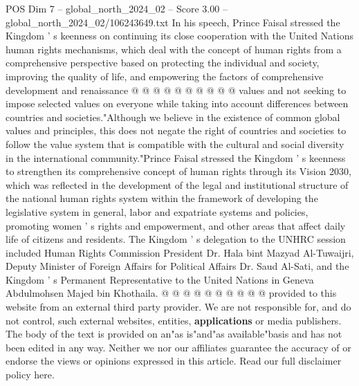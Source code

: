 \begin{textsample}{POS Dim 7 – global\_north\_2024\_02 – Score 3.00 – global\_north\_2024\_02/106243649.txt}
In his speech, Prince Faisal stressed the Kingdom ' s keenness on continuing its close cooperation with the United Nations human rights mechanisms, which deal with the concept of human rights from a comprehensive perspective based on protecting the individual and society, improving the quality of life, and empowering the factors of comprehensive development and renaissance @ @ @ @ @ @ @ @ @ @ values and not seeking to impose selected values on everyone while taking into account differences between countries and societies."Although we believe in the existence of common global values and principles, this does not negate the right of countries and societies to follow the value system that is compatible with the cultural and social diversity in the international community."Prince Faisal stressed the Kingdom ' s keenness to strengthen its comprehensive concept of human rights through its Vision 2030, which was reflected in the development of the legal and institutional structure of the national human rights system within the framework of developing the legislative system in general, labor and expatriate systems and policies, promoting women ' s rights and empowerment, and other areas that affect daily life of citizens and residents.
The Kingdom ' s delegation to the UNHRC session included Human Rights Commission President Dr.
Hala bint Mazyad Al-Tuwaijri, Deputy Minister of Foreign Affairs for Political Affairs Dr.
Saud Al-Sati, and the Kingdom ' s Permanent Representative to the United Nations in Geneva Abdulmohsen Majed bin Khothaila. @ @ @ @ @ @ @ @ @ @ provided to this website from an external third party provider.
We are not responsible for, and do not control, such external websites, entities, \textbf{applications} or media publishers.
The body of the text is provided on an"as is"and"as available"basis and has not been edited in any way.
Neither we nor our affiliates guarantee the accuracy of or endorse the views or opinions expressed in this article.
Read our full disclaimer policy here.

\end{textsample}
